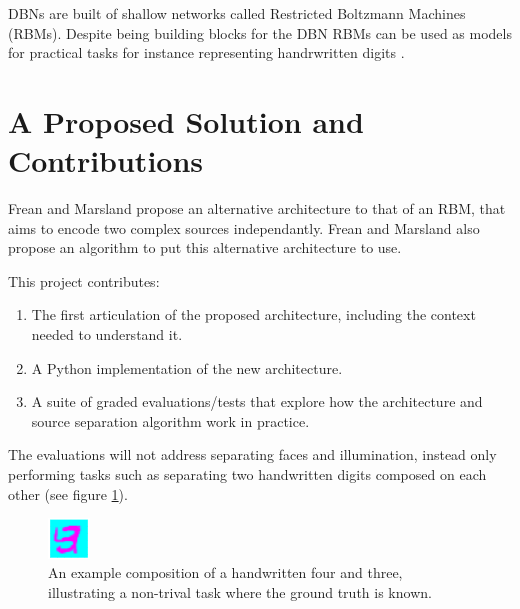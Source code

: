 DBNs are built of shallow networks called Restricted Boltzmann Machines (RBMs). Despite being building blocks for the DBN RBMs can be used as models for practical tasks for instance representing handrwritten digits \cite{fischer2014training}.

\section{A Proposed Solution and Contributions}

Frean and Marsland propose an alternative architecture to that of an RBM, that aims to encode two complex sources independantly. Frean and Marsland also propose an algorithm to put this alternative architecture to use.

This project contributes:
\begin{enumerate}[$\mathcal{C}$1.]
  \item\label{item-c1} The first articulation of the proposed architecture, including the context needed to understand it.
  \item\label{item-c2} A Python implementation of the new architecture.
  \item\label{item-c3} A suite of graded evaluations/tests that explore how the architecture and source separation algorithm work in practice.
\end{enumerate}
The evaluations will not address separating faces and illumination, instead only performing tasks such as separating two handwritten digits composed on each other (see figure \ref{F:Composition-Example}).

\begin{figure}[h]
\begin{center}
  \includegraphics[width = 0.1\textwidth]{Assets/composition-example.png}
\caption{An example composition of a handwritten four and three, illustrating a non-trival task where the ground truth is known.}
\label{F:Composition-Example}
\end{center}
\end{figure}


